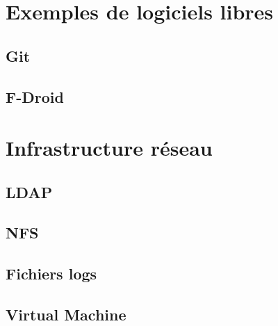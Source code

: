 \documentclass[a4paper, 12pt, titlepage]{article}
\begin{document}
\newpage
\section{Exemples de logiciels libres}
	
  \subsection{Git}
    
  \subsection{F-Droid}
    

\newpage
\section{Infrastructure réseau}
  \subsection{LDAP}
    
  \subsection{NFS}
    
  \subsection{Fichiers logs}
    
  \subsection{Virtual Machine}
    
\end{document}
